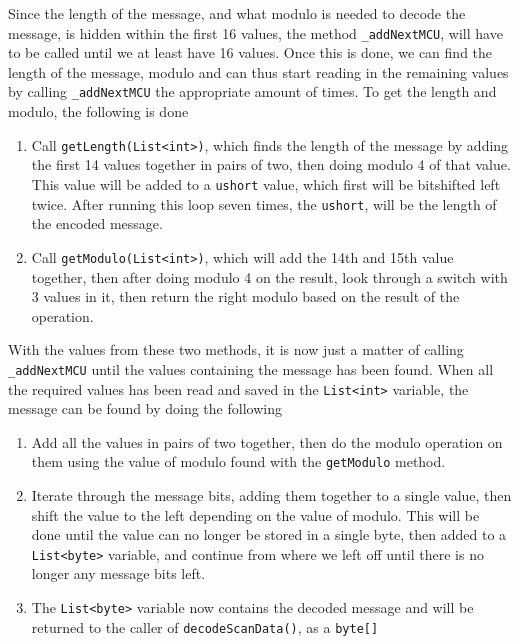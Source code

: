 Since the length of the message, and what modulo is needed to decode the message, is hidden within the first 16 values, the method \lstinline|_addNextMCU|, will have to be called until we at least have 16 values.
Once this is done, we can find the length of the message, modulo and can thus start reading in the remaining values by calling \lstinline|_addNextMCU| the appropriate amount of times.
To get the length and modulo, the following is done
\begin{enumerate}
	\item Call \lstinline|getLength(List<int>)|, which finds the length of the message by adding the first 14 values together in pairs of two, then doing modulo 4 of that value. 
	This value will be added to a \lstinline|ushort| value, which first will be bitshifted left twice. 
	After running this loop seven times, the \lstinline|ushort|, will be the length of the encoded message.
	\item Call \lstinline|getModulo(List<int>)|, which will add the 14th and 15th value together, then after doing modulo 4 on the result, look through a switch with 3 values in it, then return the right modulo based on the result of the operation.
\end{enumerate}
With the values from these two methods, it is now just a matter of calling \lstinline|_addNextMCU| until the values containing the message has been found.
When all the required values has been read and saved in the \lstinline|List<int>| variable, the message can be found by doing the following
\begin{enumerate}
	\item Add all the values in pairs of two together, then do the modulo operation on them using the value of modulo found with the \lstinline|getModulo| method.
	\item Iterate through the message bits, adding them together to a single value, then shift the value to the left depending on the value of modulo.
	This will be done until the value can no longer be stored in a single byte, then added to a \lstinline|List<byte>| variable, and continue from where we left off until there is no longer any message bits left.
	\item The \lstinline|List<byte>| variable now contains the decoded message and will be returned to the caller of \lstinline|decodeScanData()|, as a \lstinline|byte[]|
\end{enumerate}
